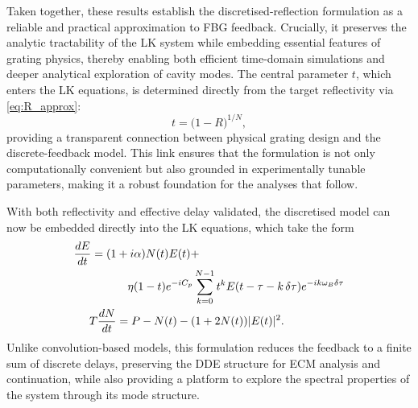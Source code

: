 %
\par
%
Taken together, these results establish the discretised-reflection formulation as a reliable and practical approximation to FBG feedback. 
Crucially, it preserves the analytic tractability of the LK system while embedding essential features of grating physics, thereby enabling both efficient time-domain simulations and deeper analytical exploration of cavity modes. 
The central parameter $t$, which enters the LK equations, is determined directly from the target reflectivity via \eqref{eq:R_approx}:
%
\begin{equation}
\label{eq:discretised_t}
t = \big(1-R\big)^{1/N},
\end{equation}
%
providing a transparent connection between physical grating design and the discrete-feedback model. 
This link ensures that the formulation is not only computationally convenient but also grounded in experimentally tunable parameters, making it a robust foundation for the analyses that follow.
%
\par
%
With both reflectivity and effective delay validated, the discretised model can now be embedded directly into the LK equations, which take the form
%
\begin{equation}
\label{eq:LK_discretised}
    \begin{aligned}
        \frac{d E}{d t} = (1 &+i \alpha) N(t) E(t) + \\
                        &\quad \eta (1-t) e^{-i C_p} \sum_{k=0}^{N-1} t^k E(t-\tau-k\, \delta \tau) e^{-i k \omega_B \delta \tau} \\
        T \frac{d N}{d t} &= P-N(t)-(1+2 N(t))|E(t)|^2.
    \end{aligned}
\end{equation}
%
Unlike convolution-based models, this formulation reduces the feedback to a finite sum of discrete delays, preserving the DDE structure for ECM analysis and continuation, while also providing a platform to explore the spectral properties of the system through its mode structure.
%
%
